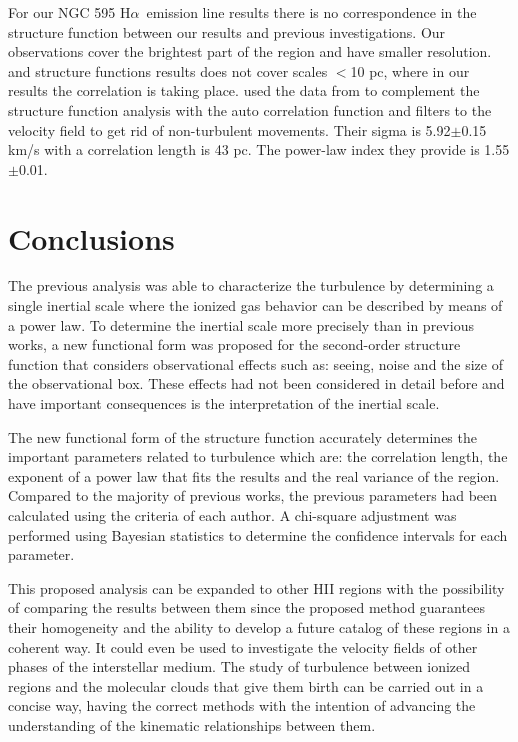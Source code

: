 \documentclass[fleqn,usenatbib, useAMS, a4paper]{mnras}
\newcommand\halpha{H${\alpha}$}
\begin{document}
For our NGC 595 \halpha\ emission line results there is no correspondence in the structure function between our results and previous investigations.
Our observations cover the brightest part of the region and have smaller resolution.
\citet{lagrois2009multi} and \citet{lagrois2011} structure functions results does not cover scales $<$10 pc, where in our results the correlation is taking place.
\citet{lagrois2011} used the data from \citet{lagrois2009multi} to complement the structure function analysis with the auto correlation function and filters to the velocity field to get rid of non-turbulent movements.
Their sigma is 5.92$\pm$0.15 km/s with a correlation length is 43 pc.
The power-law index they provide is 1.55$\pm$0.01.


\section{Conclusions}\label{sec:conclusions}

The previous analysis was able to characterize the turbulence by determining a single inertial scale where the ionized gas behavior can be described by means of a power law.
To determine the inertial scale more precisely than in previous works, a new functional form was proposed for the second-order structure function that considers observational effects such as: seeing, noise and the size of the observational box.
These effects had not been considered in detail before and have important consequences is the interpretation of the inertial scale.

The new functional form of the structure function accurately determines the important parameters related to turbulence which are: the correlation length, the exponent of a power law that fits the results and the real variance of the region.
Compared to the majority of previous works, the previous parameters had been calculated using the criteria of each author.
A chi-square adjustment was performed using Bayesian statistics to determine the confidence intervals for each parameter.

This proposed analysis can be expanded to other HII regions with the possibility of comparing the results between them since the proposed method guarantees their homogeneity and the ability to develop a future catalog of these regions in a coherent way.
It could even be used to investigate the velocity fields of other phases of the interstellar medium.
The study of turbulence between ionized regions and the molecular clouds that give them birth can be carried out in a concise way, having the correct methods with the intention of advancing the understanding of the kinematic relationships between them.
\end{document}
